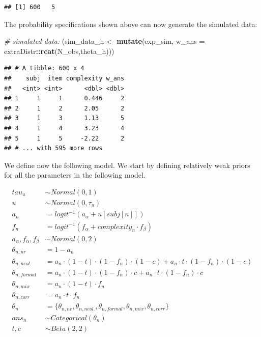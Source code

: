 \documentclass[12pt,]{krantz}
\newenvironment{Shaded}{\begin{snugshade}}{\end{snugshade}}
\newcommand{\KeywordTok}[1]{\textcolor[rgb]{0.13,0.29,0.53}{\textbf{#1}}}
\newcommand{\DataTypeTok}[1]{\textcolor[rgb]{0.13,0.29,0.53}{#1}}
\newcommand{\StringTok}[1]{\textcolor[rgb]{0.31,0.60,0.02}{#1}}
\newcommand{\CommentTok}[1]{\textcolor[rgb]{0.56,0.35,0.01}{\textit{#1}}}
\newcommand{\OperatorTok}[1]{\textcolor[rgb]{0.81,0.36,0.00}{\textbf{#1}}}
\newcommand{\NormalTok}[1]{#1}
\theoremstyle{definition}
\theoremstyle{definition}
\theoremstyle{definition}
\theoremstyle{remark}
\begin{document}
\begin{verbatim}
## [1] 600   5
\end{verbatim}

The probability specifications shown above can now generate the
simulated data:

\begin{Shaded}
\begin{Highlighting}[]
\CommentTok{# simulated data:}
\NormalTok{(sim_data_h <-}\StringTok{ }\KeywordTok{mutate}\NormalTok{(exp_sim,}
                      \DataTypeTok{w_ans =}\NormalTok{ extraDistr}\OperatorTok{::}\KeywordTok{rcat}\NormalTok{(N_obs,theta_h)))}
\end{Highlighting}
\end{Shaded}

\begin{verbatim}
## # A tibble: 600 x 4
##    subj  item complexity w_ans
##   <int> <int>      <dbl> <dbl>
## 1     1     1      0.446     2
## 2     1     2      2.05      2
## 3     1     3      1.13      5
## 4     1     4      3.23      4
## 5     1     5     -2.22      2
## # ... with 595 more rows
\end{verbatim}

We define now the following model. We start by defining relatively weak
priors for all the parameters in the following model.

\begin{equation}
\begin{aligned}
tau_u &\sim Normal(0, 1)\\
u &\sim Normal(0, \tau_u)\\
a_n &= logit^{-1}(a_\alpha + u[subj[n]])\\
f_n &= logit^{-1}(f_\alpha + complexity_n \cdot f_\beta)\\
a_\alpha, f_\alpha, f_\beta &\sim Normal(0, 2)\\
\theta_{n,nr} &= 1 - a_n \\
\theta_{n,neol.} &= a_n \cdot (1-t) \cdot (1-f_n) \cdot (1-c) +  a_n \cdot t \cdot (1-f_n) \cdot (1-c)\\
\theta_{n,formal} &= a_n \cdot (1-t) \cdot (1-f_n) \cdot c +  a_n \cdot t \cdot (1-f_n) \cdot c\\
\theta_{n,mix} &= a_n \cdot (1-t) \cdot f_n\\
\theta_{n,corr} &= a_n \cdot t \cdot f_n\\
\theta_n &= \{\theta_{n, nr}, \theta_{n, neol.}, \theta_{n, formal}, \theta_{n, mix}, \theta_{n, corr}\}\\
ans_n &\sim Categorical(\theta_n)\\
t,c &\sim Beta(2, 2)
\end{aligned}
\end{equation}
\end{document}
